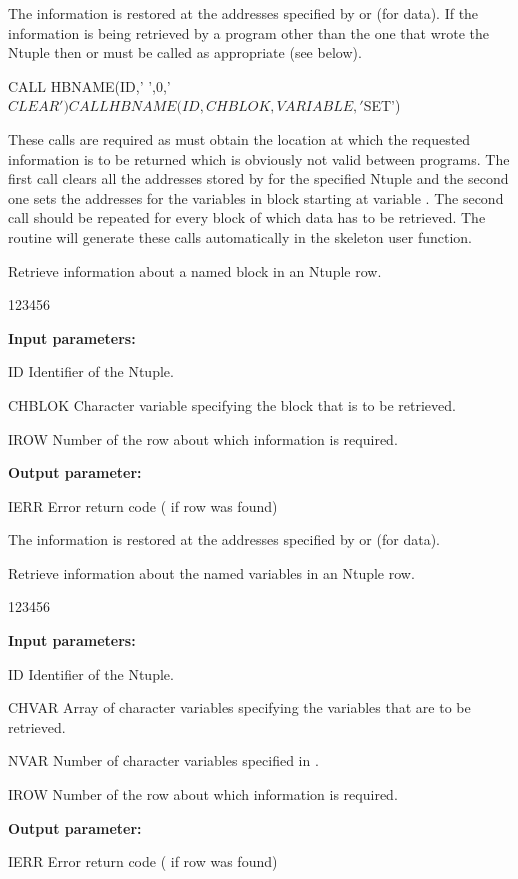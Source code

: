 The information is restored at the addresses specified by 
or  (for  data).
If the information is being retrieved by a program other than the
one that wrote the Ntuple then 
or  must be called as appropriate (see below).
\begin{XMP}
      CALL HBNAME(ID,' ',0,'$CLEAR')
      CALL HBNAME(ID,CHBLOK,VARIABLE,'$SET')
\end{XMP}
\Rind[HBNAME]{}
\Rind[HBNAMC]{}
These calls are required as  must obtain the location
at which the requested information is to be returned which is
obviously not valid between programs.
The first call clears all the addresses stored by 
for the specified Ntuple and the second one sets the
addresses for the variables in block  starting at variable
. The second call should be repeated for every block of
which data has to be retrieved. The routine  will generate
these calls automatically in the skeleton user function.


\Action

Retrieve information about a named block in an Ntuple row.

\begin{DLttc}{123456}
\item[{\rm\bf Input parameters:}]
\item[ID] Identifier of the Ntuple.
\item[CHBLOK]Character variable specifying the block that is to be
retrieved.
\item[IROW] Number of the row about which information is required.
\item[{\rm\bf Output parameter:}]
\item[IERR] Error return code ( if row was found)
\end{DLttc}

The information is restored at the addresses specified by 
or  (for  data).


\Action

Retrieve information about the named variables in an Ntuple row.

\begin{DLttc}{123456}
\item[{\rm\bf Input parameters:}]
\item[ID] Identifier of the Ntuple.
\item[CHVAR] Array of character variables specifying the variables
             that are to be retrieved.
\item[NVAR]  Number of character variables specified in .
\item[IROW] Number of the row about which information is required.
\item[{\rm\bf Output parameter:}]
\item[IERR] Error return code ( if row was found)
\end{DLttc}

